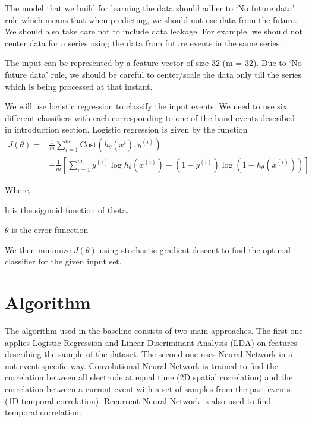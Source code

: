 \documentclass[final,leqno,onefignum,onetabnum]{siamltexmm}
\begin{document}
 


The model that we build for learning the data should adher to `No future data' rule\cite{kaggledata} which means that when predicting, we should not use data from the future.  We should also take care not to include data leakage.  For example, we should not center data for a series using the data from future events in the same series.

The input can be represented by a feature vector of size 32 (m = 32).  
Due to `No future data' rule, we should be careful to center/scale the data only till the series which is being processed at that instant.

We will use logistic regression to classify the input events.  We need to use six different classifiers with each corresponding to one of the hand events described in introduction section.  Logistic regression is given by the function
\begin{align*}
  J(\theta) = & \frac{1}{m} \sum_{i = 1}^{m} \mathrm{Cost}(h_{\theta}(x^{i}), y^{(i)}) \\
  = & -\frac{1}{m} [\sum_{i=1}^{m} y^{(i)} \log{h_{\theta}(x^{(i)} )} + (1 - y^{(i)}) \log{( 1 - h_{\theta}(x^{(i)}) )}]
\end{align*}

  Where,

  h is the sigmoid function of theta.

  \(\theta\) is the error funcction

  We then minimize \(J(\theta)\) using stochastic gradient descent to find the optimal classifier for the given input set.

\section{Algorithm}
The algorithm used in the baseline consists of two main approaches. The first one applies Logistic Regression and Linear Discriminant Analysis (LDA) on features describing the sample of the dataset. The second one uses Neural Network in a not event-specific way. Convolutional Neural Network is trained to find the correlation between all electrode at equal time (2D spatial correlation) and the correlation between a current event with a set of samples from the past events (1D temporal correlation). Recurrent Neural Network is also used to find temporal correlation.
\end{document}
